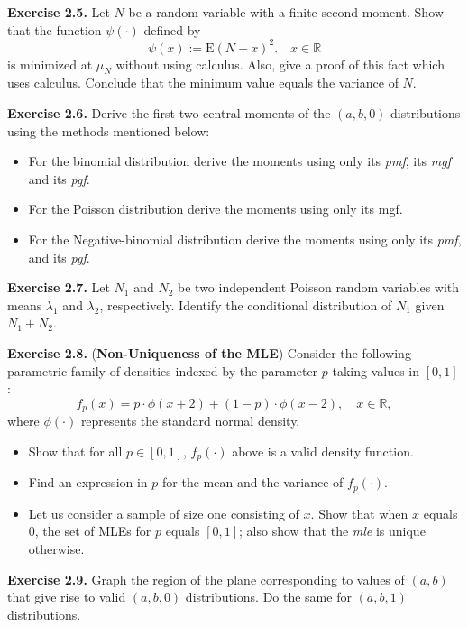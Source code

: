 \documentclass[]{book}
\providecommand{\tightlist}{%
  \setlength{\itemsep}{0pt}\setlength{\parskip}{0pt}}
\theoremstyle{definition}
\theoremstyle{definition}
\theoremstyle{definition}
\theoremstyle{remark}
\begin{document}
\textbf{Exercise 2.5.} Let \(N\) be a random variable with a finite
second moment. Show that the function \(\psi(\cdot)\) defined by \[
\psi(x):=\mathrm{E}{(N-x)^2}. \quad x\in\mathbb{R}
\] is minimized at \(\mu_N\) without using calculus. Also, give a proof
of this fact which uses calculus. Conclude that the minimum value equals
the variance of \(N\).

\textbf{Exercise 2.6.} Derive the first two central moments of the
\((a,b,0)\) distributions using the methods mentioned below:

\begin{itemize}
\tightlist
\item
  For the binomial distribution derive the moments using only its
  \emph{pmf}, its \emph{mgf} and its \emph{pgf}.
\item
  For the Poisson distribution derive the moments using only its mgf.
\item
  For the Negative-binomial distribution derive the moments using only
  its \emph{pmf}, and its \emph{pgf}.
\end{itemize}

\textbf{Exercise 2.7.} Let \(N_1\) and \(N_2\) be two independent
Poisson random variables with means \(\lambda_1\) and \(\lambda_2\),
respectively. Identify the conditional distribution of \(N_1\) given
\(N_1+N_2\).

\textbf{Exercise 2.8.} (\textbf{Non-Uniqueness of the MLE}) Consider the
following parametric family of densities indexed by the parameter \(p\)
taking values in \([0,1]\): \[
f_p(x)=p\cdot\phi(x+2)+(1-p)\cdot\phi(x-2), \quad x\in\mathbb{R},
\] where \(\phi(\cdot)\) represents the standard normal density.

\begin{itemize}
\tightlist
\item
  Show that for all \(p\in[0,1]\), \(f_p(\cdot)\) above is a valid
  density function.
\item
  Find an expression in \(p\) for the mean and the variance of
  \(f_p(\cdot)\).
\item
  Let us consider a sample of size one consisting of \(x\). Show that
  when \(x\) equals \(0\), the set of MLEs for \(p\) equals \([0,1]\);
  also show that the \emph{mle} is unique otherwise.
\end{itemize}

\textbf{Exercise 2.9.} Graph the region of the plane corresponding to
values of \((a,b)\) that give rise to valid \((a,b,0)\) distributions.
Do the same for \((a,b,1)\) distributions.
\end{document}
